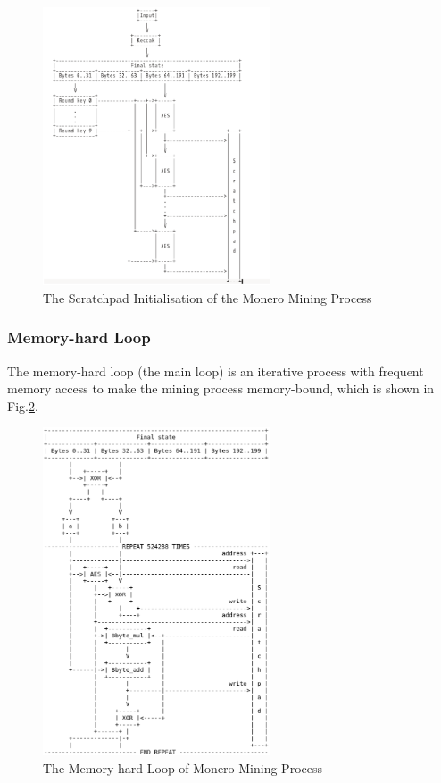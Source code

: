 \documentclass[11pt]{article}
\begin{document}
\begin{figure}[h]
    \centering
    \includegraphics[width=0.6\textwidth]{monero_mining_scratchpad_init.eps}
    \caption{The Scratchpad Initialisation of the Monero Mining Process}
    \label{fig:monero_mining_scratchpad_init}
\end{figure}

\subsubsection{Memory-hard Loop}

The memory-hard loop (the main loop) is an iterative process with frequent memory access to make the mining process memory-bound, which is shown in Fig.\ref{fig:monero_mining_main_loop}.

\begin{figure}[h]
    \centering
    \includegraphics[width=0.6\textwidth]{monero_mining_main_loop.eps}
    \caption{The Memory-hard Loop of Monero Mining Process}
    \label{fig:monero_mining_main_loop}
\end{figure}
\end{document}
